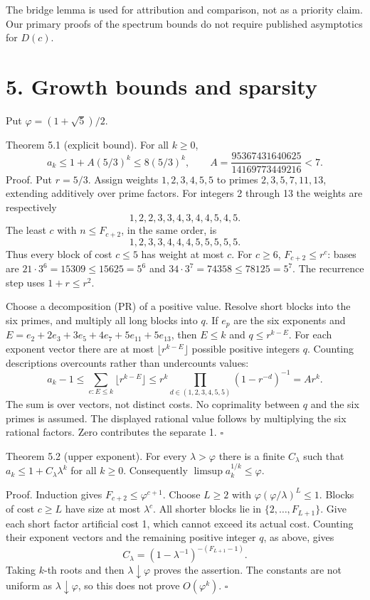 \documentclass[11pt]{article}
\begin{document}
The bridge lemma is used for attribution and comparison, not as a priority claim. Our primary proofs of the spectrum bounds do not require published asymptotics for \(D(c)\).

\section*{5. Growth bounds and sparsity}

Put \(\varphi=(1+\sqrt5)/2\).

Theorem 5.1 (explicit bound). For all \(k\ge0\),
\[
a_k\le1+A(5/3)^k\le8(5/3)^k,\qquad
A=\frac{95367431640625}{14169773449216}<7.
\]
Proof. Put \(r=5/3\). Assign weights \(1,2,3,4,5,5\) to primes \(2,3,5,7,11,13\), extending additively over prime factors. For integers 2 through 13 the weights are respectively
\[
1,2,2,3,3,4,3,4,4,5,4,5.
\]
The least \(c\) with \(n\le F_{c+2}\), in the same order, is
\[
1,2,3,3,4,4,4,5,5,5,5,5.
\]
Thus every block of cost \(c\le5\) has weight at most \(c\). For \(c\ge6\), \(F_{c+2}\le r^c\): bases are \(21\cdot3^6=15309\le15625=5^6\) and \(34\cdot3^7=74358\le78125=5^7\). The recurrence step uses \(1+r\le r^2\).

Choose a decomposition (PR) of a positive value. Resolve short blocks into the six primes, and multiply all long blocks into \(q\). If \(e_p\) are the six exponents and \(E=e_2+2e_3+3e_5+4e_7+5e_{11}+5e_{13}\), then \(E\le k\) and \(q\le r^{k-E}\). For each exponent vector there are at most \(\lfloor r^{k-E}\rfloor\) possible positive integers \(q\). Counting descriptions overcounts rather than undercounts values:
\[
a_k-1\le\sum_{e:E\le k}\lfloor r^{k-E}\rfloor
\le r^k\prod_{d\in(1,2,3,4,5,5)}(1-r^{-d})^{-1}=Ar^k.
\]
The sum is over vectors, not distinct costs. No coprimality between \(q\) and the six primes is assumed. The displayed rational value follows by multiplying the six rational factors. Zero contributes the separate 1. \(\square\)

Theorem 5.2 (upper exponent). For every \(\lambda>\varphi\) there is a finite \(C_\lambda\) such that \(a_k\le1+C_\lambda\lambda^k\) for all \(k\ge0\). Consequently \(\limsup a_k^{1/k}\le\varphi\).

Proof. Induction gives \(F_{c+2}\le\varphi^{c+1}\). Choose \(L\ge2\) with \(\varphi(\varphi/\lambda)^L\le1\). Blocks of cost \(c\ge L\) have size at most \(\lambda^c\). All shorter blocks lie in \(\{2,\ldots,F_{L+1}\}\). Give each short factor artificial cost 1, which cannot exceed its actual cost. Counting their exponent vectors and the remaining positive integer \(q\), as above, gives
\[
C_\lambda=(1-\lambda^{-1})^{-(F_{L+1}-1)}.
\]
Taking \(k\)-th roots and then \(\lambda\downarrow\varphi\) proves the assertion. The constants are not uniform as \(\lambda\downarrow\varphi\), so this does not prove \(O(\varphi^k)\). \(\square\)
\end{document}
